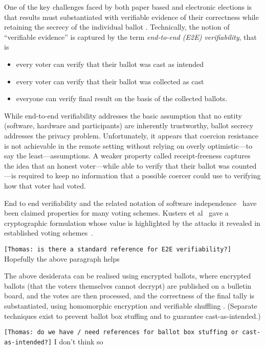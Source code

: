 \documentclass{llncs}
\begin{document}
One of the key challenges faced by both paper based and electronic
elections is that results must substantiated with
verifiable evidence of their correctness while retaining the secrecy
of the individual ballot \cite{Bernhard:2017:PES}.  Technically, the
notion of ``verifiable evidence'' is captured by the term 
\emph{end-to-end (E2E) verifiability}, that is
\begin{itemize}
  \item every voter can verify that their ballot was cast as
  intended
  \item every voter can verify that their ballot was collected as
  cast
  \item everyone can verify final result on the basis of the
  collected ballots.
\end{itemize}
While end-to-end verifiability addresses the basic assumption that
no entity (software, hardware and participants) are inherently
trustworthy, ballot secrecy addresses the privacy problem.
Unfortunately, it appears that coercion resistance is not achievable  
in the remote setting without relying on overly optimistic---to say the least---assumptions.
A weaker property called receipt-freeness captures the idea that an honest 
voter---while able to verify that their ballot was counted---is required to keep 
no information that a possible coercer could use to verifying how that voter had voted.

End to end verifiability and the related notation of software independence~\cite{Rivest:2008:PTRS}
 have been claimed properties for many voting schemes.  Kusters et al~\cite{Kusters:2010:CCS} gave
 a cryptographic formulation whose value is highlighted by the attacks it revealed in established voting 
 schemes~\cite{Kusters:2012:SP}.
\begin{center}
\texttt{[Thomas: is there a standard reference for E2E
verifiability?]}
Hopefully the above paragraph helps
\end{center}

The above desiderata can be realised using encrypted ballots, where
encrypted ballots (that the voters themselves cannot decrypt) are
published on a bulletin board, and the votes are then processed, and
the correctness of the final tally is substantiated, using
homomorphic encryption \cite{Hirt:2000:ERF} and verifiable shuffling
\cite{Bayer:2012:EZK}. (Separate techniques exist to prevent ballot
box stuffing and to guarantee cast-as-intended.)

\begin{center}
\texttt{[Thomas: do we have / need references for ballot box
stuffing or cast-as-intended?]}
I don't think so
\end{center}
\end{document}
